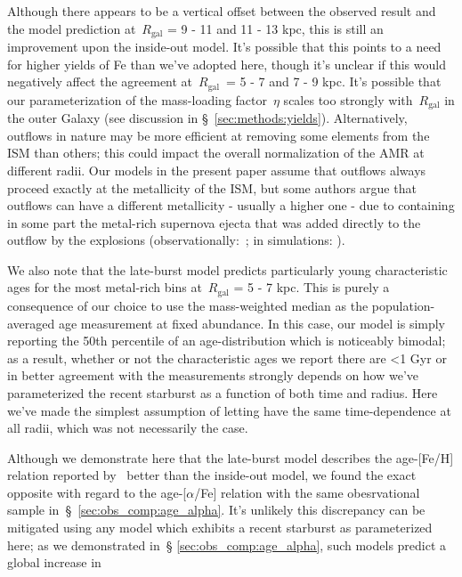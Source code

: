 \documentclass[fleqn, usenatbib]{mnras}
\begin{document}
\par 
Although there appears to be a vertical offset between the observed result and 
the model prediction at~$R_\text{gal}$ = 9 - 11 and 11 - 13 kpc, this is still 
an improvement upon the inside-out model. It's possible that this points to a 
need for higher yields of Fe than we've adopted here, though it's unclear if 
this would negatively affect the agreement at~$R_\text{gal}$~= 5 - 7 and 7 - 9 
kpc. It's possible that our parameterization of the mass-loading factor~$\eta$ 
scales too strongly with~$R_\text{gal}$ in the outer Galaxy (see discussion in 
\S~\ref{sec:methods:yields}). Alternatively, outflows in nature may be more 
efficient at removing some elements from the ISM than others; this could impact 
the overall normalization of the AMR at different radii. Our models in the 
present paper assume that outflows always proceed exactly at the metallicity of 
the ISM, but some authors argue that outflows can have a different metallicity 
- usually a higher one - due to containing in some part the metal-rich 
supernova ejecta that was added directly to the outflow by the explosions 
(observationally:~\citealp*{Chisholm2018}; in simulations: 
\citealp{Christensen2018}). 
\par 
We also note that the late-burst model predicts particularly young 
characteristic ages for the most metal-rich bins at~$R_\text{gal}$ = 5 - 7 kpc. 
This is purely a consequence of our choice to use the mass-weighted median as 
the population-averaged age measurement at fixed abundance. In this case, our 
model is simply reporting the 50th percentile of an age-distribution 
which is noticeably bimodal; as a result, whether or not the characteristic 
ages we report there are <1 Gyr or in better agreement with the 
\citet{Feuillet2019} measurements strongly depends on how we've parameterized 
the recent starburst as a function of both time and radius. Here we've made the 
simplest assumption of letting have the same time-dependence at all radii, 
which was not necessarily the case. 
\par 
Although we demonstrate here that the late-burst model describes the age-[Fe/H] 
relation reported by~\citet{Feuillet2019} better than the inside-out model, we 
found the exact opposite with regard to the age-[$\alpha$/Fe] relation with 
the same obesrvational sample in~\S~\ref{sec:obs_comp:age_alpha}. It's unlikely 
this discrepancy can be mitigated using any model which exhibits a recent 
starburst as parameterized here; as we demonstrated in~\S 
\ref{sec:obs_comp:age_alpha}, such models predict a global increase in 
\end{document}
